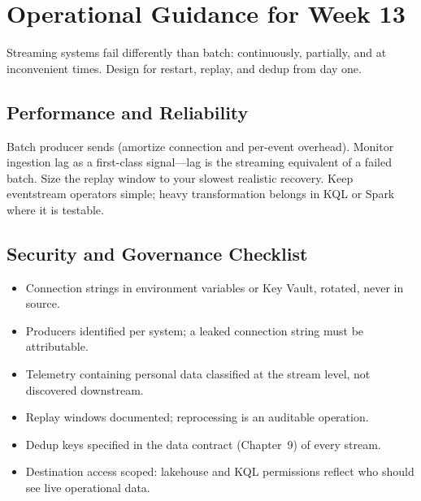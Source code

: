 \section{Operational Guidance for Week 13}
Streaming systems fail differently than batch: continuously, partially, and at inconvenient times. Design for restart, replay, and dedup from day one.

\subsection{Performance and Reliability}
Batch producer sends (amortize connection and per-event overhead). Monitor ingestion lag as a first-class signal---lag is the streaming equivalent of a failed batch. Size the replay window to your slowest realistic recovery. Keep eventstream operators simple; heavy transformation belongs in KQL or Spark where it is testable.

\subsection{Security and Governance Checklist}
\begin{itemize}
    \item Connection strings in environment variables or Key Vault, rotated, never in source.
    \item Producers identified per system; a leaked connection string must be attributable.
    \item Telemetry containing personal data classified at the stream level, not discovered downstream.
    \item Replay windows documented; reprocessing is an auditable operation.
    \item Dedup keys specified in the data contract (Chapter~9) of every stream.
    \item Destination access scoped: lakehouse and KQL permissions reflect who should see live operational data.
\end{itemize}

